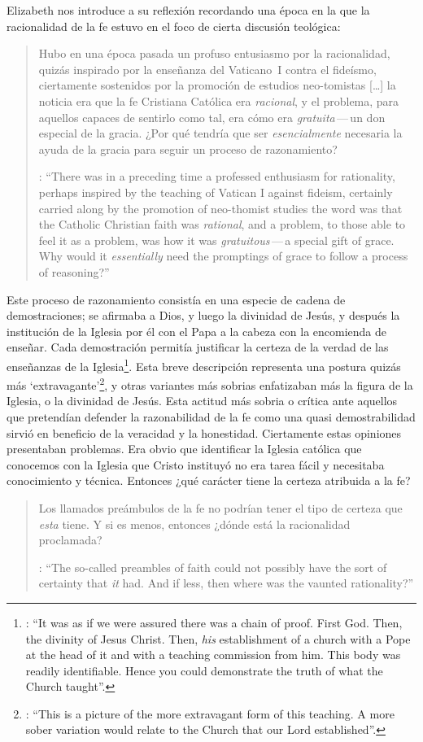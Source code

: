 Elizabeth nos introduce a su reflexión recordando una época en la que la racionalidad de la fe estuvo en el foco de cierta discusión teológica: \blockquote[{\Cite[113]{anscombe1981erp:faith}}: \enquote{There was in a preceding time a professed enthusiasm for rationality, perhaps inspired by the teaching of Vatican I against fideism, certainly carried along by the promotion of neo-thomist studies \textelp{} the word was that the Catholic Christian faith was \emph{rational}, and a problem, to those able to feel it as a problem, was how it was \emph{gratuitous}\,---\,a special gift of grace. Why would it \emph{essentially} need the promptings of grace to follow a process of reasoning?}]{Hubo en una época pasada un profuso entusiasmo por la racionalidad, quizás inspirado por la enseñanza del Vaticano~I contra el fideísmo, ciertamente sostenidos por la promoción de estudios neo-tomistas [\ldots] la noticia era que la fe Cristiana Católica era \emph{racional}, y el problema, para aquellos capaces de sentirlo como tal, era cómo era \emph{gratuita}\,---\,un don especial de la gracia. ¿Por qué tendría que ser \emph{esencialmente} necesaria la ayuda de la gracia para seguir un proceso de razonamiento?} 

Este proceso de razonamiento consistía en una especie de cadena de demostraciones; se afirmaba a Dios, y luego la divinidad de Jesús, y después la institución de la Iglesia por él con el Papa a la cabeza con la encomienda de enseñar. Cada demostración permitía justificar la certeza de la verdad de las enseñanzas de la Iglesia\footnote{\cite[Cf.][113]{anscombe1981erp:faith}: \enquote{It was as if we were assured there was a chain of proof. First God. Then, the divinity of Jesus Christ. Then, \emph{his} establishment of a church with a Pope at the head of it and with a teaching commission from him. This body was readily identifiable. Hence you could demonstrate the truth of what the Church taught}.}. Esta breve descripción representa una postura quizás más `extravagante'\footnote{\cite[Cf.][113]{anscombe1981erp:faith}: \enquote{This is a picture of the more extravagant form of this teaching. A more sober variation would relate to the Church that our Lord established}.}, y otras variantes más sobrias enfatizaban más la figura de la Iglesia, o la divinidad de Jesús. Esta actitud más sobria o crítica ante aquellos que pretendían defender la razonabilidad de la fe como una quasi demostrabilidad sirvió en beneficio de la veracidad y la honestidad. Ciertamente estas opiniones presentaban problemas. Era obvio que identificar la Iglesia católica que conocemos con la Iglesia que Cristo instituyó no era tarea fácil y necesitaba conocimiento y técnica. Entonces ¿qué carácter tiene la certeza atribuida a la fe? \blockquote[{\Cite[114]{anscombe1981erp:faith}}: \enquote{The so-called preambles of faith could not possibly have the sort of certainty that \emph{it} had. And if less, then where was the vaunted rationality?}]{Los llamados preámbulos de la fe no podrían tener el tipo de certeza que \emph{esta} tiene. Y si es menos, entonces ¿dónde está la racionalidad proclamada?}. 

